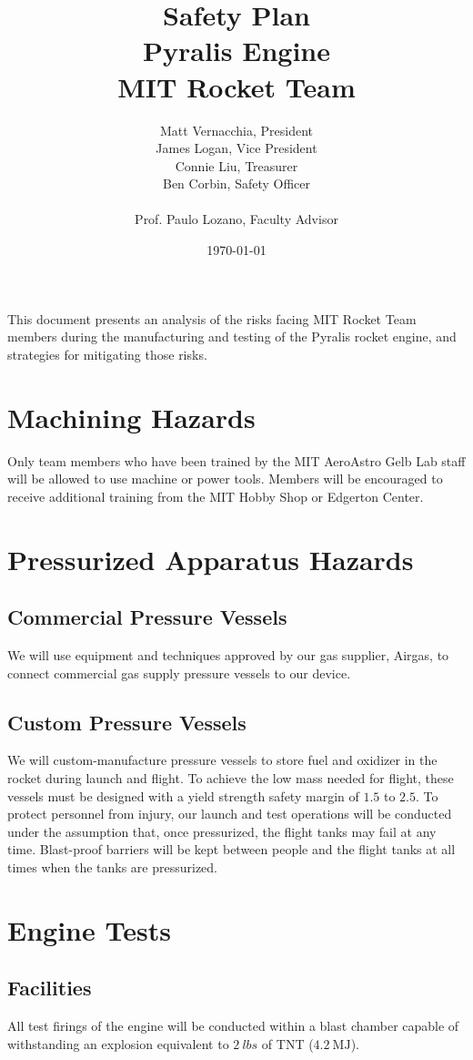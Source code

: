\documentclass{article}
\title{Safety Plan \\ Pyralis Engine \\ MIT Rocket Team} %
\author{Matt Vernacchia, President\\James Logan, Vice President\\Connie Liu, Treasurer\\Ben Corbin, Safety Officer
\\\\ Prof. Paulo Lozano, Faculty Advisor} %
\date{ \today } %
\begin{document}
\maketitle
This document presents an analysis of the risks facing MIT Rocket Team members during the manufacturing and testing of the Pyralis rocket engine, and strategies for mitigating those risks.
\section{Machining Hazards}
Only team members who have been trained by the MIT AeroAstro Gelb Lab staff will be allowed to use machine or power tools. Members will be encouraged to receive additional training from the MIT Hobby Shop or Edgerton Center.

\section{Pressurized Apparatus Hazards}
\subsection{Commercial Pressure Vessels}
We will use equipment and techniques approved by our gas supplier, Airgas, to connect commercial gas supply pressure vessels to our device.
\subsection{Custom Pressure Vessels}
We will custom-manufacture pressure vessels to store fuel and oxidizer in the rocket during launch and flight. To achieve the low mass needed for flight, these vessels must be designed with a yield strength safety margin of $1.5$ to $2.5$. To protect personnel from injury, our launch and test operations will be conducted under the assumption that, once pressurized, the flight tanks may fail at any time. Blast-proof barriers will be kept between people and the flight tanks at all times when the tanks are pressurized.

\section{Engine Tests}
\subsection{Facilities}
All test firings of the engine will be conducted within a blast chamber capable of withstanding an explosion equivalent to $\SI{2}{lbs}$ of TNT ($\SI{4.2}{\mega\joule}$).
\end{document}
